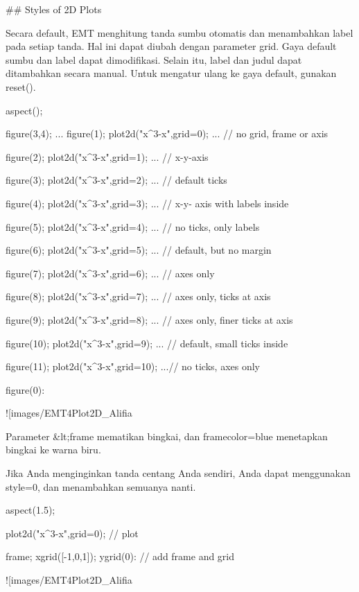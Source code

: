 \documentclass{article}
\begin{document}
## Styles of 2D Plots

Secara default, EMT menghitung tanda sumbu otomatis dan menambahkan
label pada setiap tanda. Hal ini dapat diubah dengan parameter grid.
Gaya default sumbu dan label dapat dimodifikasi. Selain itu, label dan
judul dapat ditambahkan secara manual. Untuk mengatur ulang ke gaya
default, gunakan reset().


\>aspect();

\>figure(3,4); ...  
\>    figure(1); plot2d("x^3-x",grid=0); ... // no grid, frame or axis

\> figure(2); plot2d("x^3-x",grid=1); ... // x-y-axis

\> figure(3); plot2d("x^3-x",grid=2); ... // default ticks

\> figure(4); plot2d("x^3-x",grid=3); ... // x-y- axis with labels inside

\> figure(5); plot2d("x^3-x",grid=4); ... // no ticks, only labels

\> figure(6); plot2d("x^3-x",grid=5); ... // default, but no margin

\> figure(7); plot2d("x^3-x",grid=6); ... // axes only

\> figure(8); plot2d("x^3-x",grid=7); ... // axes only, ticks at axis

\> figure(9); plot2d("x^3-x",grid=8); ... // axes only, finer ticks at axis

\> figure(10); plot2d("x^3-x",grid=9); ... // default, small ticks inside

\> figure(11); plot2d("x^3-x",grid=10); ...// no ticks, axes only

\> figure(0):


![images/EMT4Plot2D_Alifia%

Parameter &lt;frame mematikan bingkai, dan framecolor=blue menetapkan
bingkai ke warna biru.


Jika Anda menginginkan tanda centang Anda sendiri, Anda dapat
menggunakan style=0, dan menambahkan semuanya nanti.


\>aspect(1.5); 

\>plot2d("x^3-x",grid=0); // plot

\>frame; xgrid([-1,0,1]); ygrid(0): // add frame and grid


![images/EMT4Plot2D_Alifia%
\end{document}
